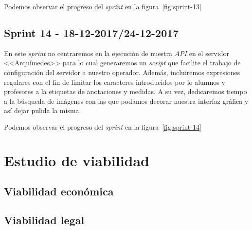 Podemos observar el progreso del \textit{sprint} en la figura~\ref{fig:sprint-13}

\subsection{Sprint 14 - 18-12-2017/24-12-2017}
En este \textit{sprint} no centraremos en la ejecución de nuestra \textit{API} en el servidor <<Arquímedes>> para lo cual generaremos un \textit{script} que facilite el trabajo de configuración del servidor a nuestro operador. Además, incluiremos expresiones regulares con el fin de limitar los caracteres introducidos por lo alumnos y profesores a la etiquetas de anotaciones y medidas. A su vez, dedicaremos tiempo a la búsqueda de imágenes con las que podamos decorar nuestra interfaz gráfica y así dejar pulida la misma.

Podemos observar el progreso del \textit{sprint} en la figura~\ref{fig:sprint-14}


\section{Estudio de viabilidad}

\subsection{Viabilidad económica}

\subsection{Viabilidad legal}


